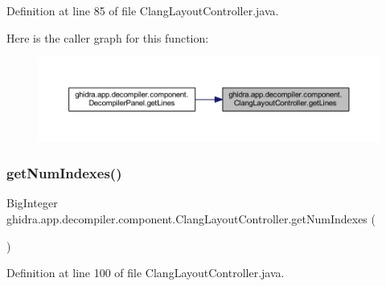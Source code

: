 Definition at line 85 of file Clang\+Layout\+Controller.\+java.

Here is the caller graph for this function\+:
\nopagebreak
\begin{figure}[H]
\begin{center}
\leavevmode
\includegraphics[width=350pt]{classghidra_1_1app_1_1decompiler_1_1component_1_1_clang_layout_controller_afe26d06573964fae5ecfc801d315e092_icgraph}
\end{center}
\end{figure}
\mbox{\label{classghidra_1_1app_1_1decompiler_1_1component_1_1_clang_layout_controller_a724aeb98b817a67d888b20d07328fde7}} 
\subsubsection{\texorpdfstring{getNumIndexes()}{getNumIndexes()}}
{\footnotesize\ttfamily Big\+Integer ghidra.\+app.\+decompiler.\+component.\+Clang\+Layout\+Controller.\+get\+Num\+Indexes (\begin{DoxyParamCaption}{ }\end{DoxyParamCaption})\hspace{0.3cm}{\ttfamily [inline]}}



Definition at line 100 of file Clang\+Layout\+Controller.\+java.


